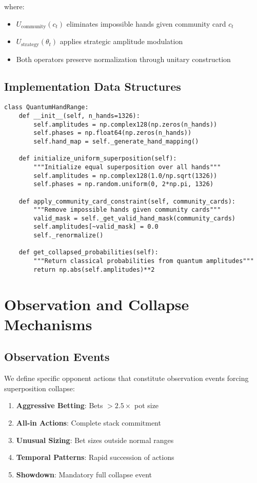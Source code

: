 \documentclass[11pt,a4paper]{article}
\begin{document}
where:
\begin{itemize}
\item $U_{\text{community}}(c_t)$ eliminates impossible hands given community card $c_t$
\item $U_{\text{strategy}}(\theta_t)$ applies strategic amplitude modulation
\item Both operators preserve normalization through unitary construction
\end{itemize}

\subsection{Implementation Data Structures}

\begin{lstlisting}
class QuantumHandRange:
    def __init__(self, n_hands=1326):
        self.amplitudes = np.complex128(np.zeros(n_hands))
        self.phases = np.float64(np.zeros(n_hands))
        self.hand_map = self._generate_hand_mapping()
        
    def initialize_uniform_superposition(self):
        """Initialize equal superposition over all hands"""
        self.amplitudes = np.complex128(1.0/np.sqrt(1326))
        self.phases = np.random.uniform(0, 2*np.pi, 1326)
        
    def apply_community_card_constraint(self, community_cards):
        """Remove impossible hands given community cards"""
        valid_mask = self._get_valid_hand_mask(community_cards)
        self.amplitudes[~valid_mask] = 0.0
        self._renormalize()
        
    def get_collapsed_probabilities(self):
        """Return classical probabilities from quantum amplitudes"""
        return np.abs(self.amplitudes)**2
\end{lstlisting}

\section{Observation and Collapse Mechanisms}

\subsection{Observation Events}

We define specific opponent actions that constitute observation events forcing superposition collapse:

\begin{enumerate}
\item \textbf{Aggressive Betting}: Bets $> 2.5 \times$ pot size
\item \textbf{All-in Actions}: Complete stack commitment
\item \textbf{Unusual Sizing}: Bet sizes outside normal ranges
\item \textbf{Temporal Patterns}: Rapid succession of actions
\item \textbf{Showdown}: Mandatory full collapse event
\end{enumerate}
\end{document}
